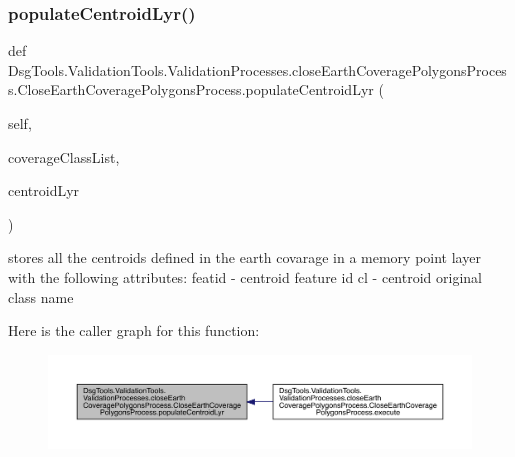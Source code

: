 \subsubsection{\texorpdfstring{populate\+Centroid\+Lyr()}{populateCentroidLyr()}}
{\footnotesize\ttfamily def Dsg\+Tools.\+Validation\+Tools.\+Validation\+Processes.\+close\+Earth\+Coverage\+Polygons\+Process.\+Close\+Earth\+Coverage\+Polygons\+Process.\+populate\+Centroid\+Lyr (\begin{DoxyParamCaption}\item[{}]{self,  }\item[{}]{coverage\+Class\+List,  }\item[{}]{centroid\+Lyr }\end{DoxyParamCaption})}

\begin{DoxyVerb}stores all the centroids defined in the earth covarage
in a memory point layer with the following attributes:
featid - centroid feature id
cl - centroid original class name
\end{DoxyVerb}
 Here is the caller graph for this function\+:
\nopagebreak
\begin{figure}[H]
\begin{center}
\leavevmode
\includegraphics[width=350pt]{class_dsg_tools_1_1_validation_tools_1_1_validation_processes_1_1close_earth_coverage_polygons_pcbfc5684de655aabbd7cec48624aa747_a150351756fbd03b76bf6b919d8810470_icgraph}
\end{center}
\end{figure}
\mbox{\label{class_dsg_tools_1_1_validation_tools_1_1_validation_processes_1_1close_earth_coverage_polygons_pcbfc5684de655aabbd7cec48624aa747_ab8f31c97e5564aeb498f3c289c5123d9}} 
